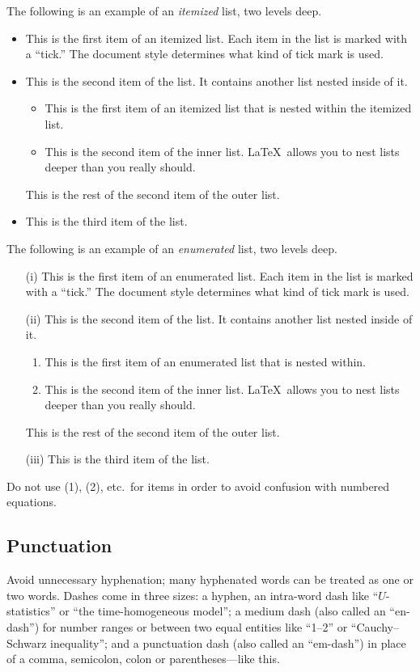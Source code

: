 \documentclass[qe,nameyear,draft]{econsocart}
\theoremstyle{plain}
\theoremstyle{remark}
\begin{document}
The following is an example of an \emph{itemized} list,
two levels deep.
\begin{itemize}
\item
This is the first item of an itemized list.  Each item
in the list is marked with a ``tick.''  The document
style determines what kind of tick mark is used.
\item
This is the second item of the list.  It contains another
list nested inside of it.
\begin{itemize}
\item This is the first item of an itemized list that
is nested within the itemized list.
\item This is the second item of the inner list.  \LaTeX\
allows you to nest lists deeper than you really should.
\end{itemize}
This is the rest of the second item of the outer list.
\item
This is the third item of the list.
\end{itemize}

The following is an example of an \emph{enumerated} list, two levels deep.
\begin{enumerate}[(ii)]
\item[(i)]
This is the first item of an enumerated list.  Each item
in the list is marked with a ``tick.''  The document
style determines what kind of tick mark is used.
\item[(ii)]
This is the second item of the list.  It contains another
list nested inside of it.
\begin{enumerate}
\item
This is the first item of an enumerated list that
is nested within.
\item
This is the second item of the inner list.  \LaTeX\
allows you to nest lists deeper than you really should.
\end{enumerate}
This is the rest of the second item of the outer list.
\item [(iii)]
This is the third item of the list.
\end{enumerate}

Do not use (1), (2), etc.\ for items in order to avoid confusion with numbered equations.

\subsection{Punctuation}
Avoid unnecessary hyphenation; many hyphenated words can be treated as one or two words.
Dashes come in three sizes: a hyphen, an intra-word dash like ``$U$-statistics'' or ``the time-homogeneous model'';
a medium dash (also called an ``en-dash'') for number ranges or between two equal entities like ``1--2'' or ``Cauchy--Schwarz inequality'';
and a punctuation dash (also called an ``em-dash'') in place of a comma, semicolon,
colon or parentheses---like this.
\end{document}
